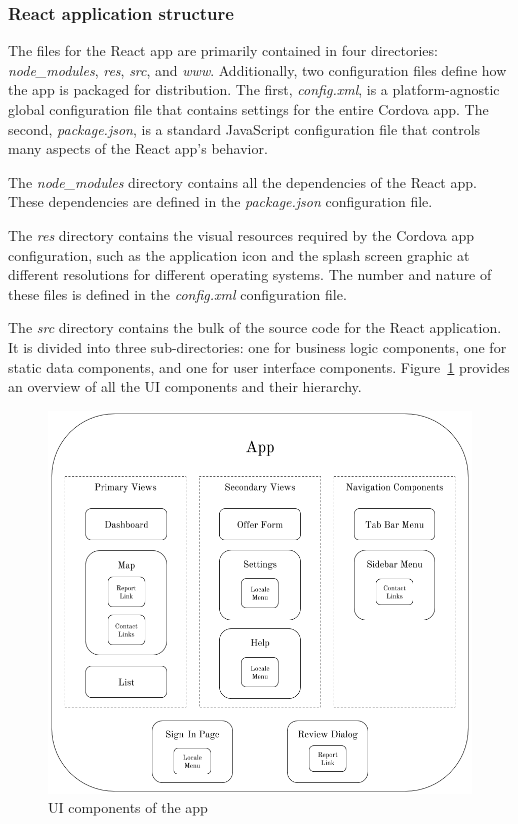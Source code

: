 \subsubsection*{React application structure}

The files for the React app are primarily contained in four directories: \textit{node\_modules}, \textit{res}, \textit{src}, and \textit{www}. Additionally, two configuration files define how the app is packaged for distribution. The first, \textit{config.xml}, is a platform-agnostic global configuration file that contains settings for the entire Cordova app. The second, \textit{package.json}, is a standard JavaScript configuration file that controls many aspects of the React app's behavior.

The \textit{node\_modules} directory contains all the dependencies of the React app. These dependencies are defined in the \textit{package.json} configuration file.

The \textit{res} directory contains the visual resources required by the Cordova app configuration, such as the application icon and the splash screen graphic at different resolutions for different operating systems. The number and nature of these files is defined in the \textit{config.xml} configuration file.

The \textit{src} directory contains the bulk of the source code for the React application. It is divided into three sub-directories: one for business logic components, one for static data components, and one for user interface components. Figure~\ref{fig:ui_architecture} provides an overview of all the UI components and their hierarchy.

\begin{figure}[ht]
  \centering
  \includegraphics[width=\textwidth]{images/ui_architecture.png}
  \caption{UI components of the app}
  \label{fig:ui_architecture}
\end{figure}

